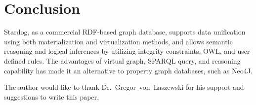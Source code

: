 \section{Conclusion}
Stardog, as a commercial RDF-based graph database, supports data 
unification using both materialization and virtualization methods, and allows 
semantic reasoning and logical inferences by utilizing integrity constraints, 
OWL, and user-defined rules. The advantages of virtual graph, SPARQL 
query, and reasoning capability has made it an alternative to property graph 
databases, such as Neo4J. 


\begin{acks}

  The author would like to thank Dr.~Gregor~von~Laszewski for his
  support and suggestions to write this paper.

\end{acks}


 

